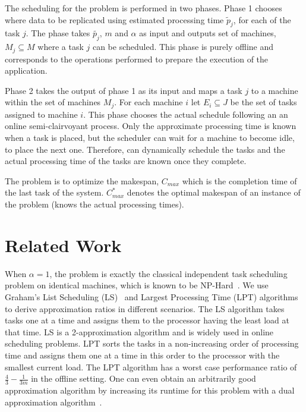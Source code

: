 \documentclass[10pt, conference, compsocconf]{IEEEtran}
\begin{document}
The scheduling for the problem is performed in two phases. Phase 1
chooses where data to be replicated using estimated processing time
$\tilde p_j $, for each of the task $j$. The phase takes
$\tilde{p_j}$, $m$ and $\alpha$ as input and outputs set of machines,
$M_j \subseteq M $ where a task $j$ can be scheduled. This phase is
purely offline and corresponds to the operations performed to prepare
the execution of the application.

Phase 2 takes the output of phase 1 as its input and maps a task $j$
to a machine within the set of machines $M_j$. For each machine $i$
let $E_i \subseteq J$ be the set of tasks assigned to machine
$i$. This phase chooses the actual schedule following an an online
semi-clairvoyant process. Only the approximate processing time is
known when a task is placed, but the scheduler can wait for a machine
to become idle, to place the next one. Therefore, can dynamically
schedule the tasks and the actual processing time of the tasks are
known once they complete.

The problem is to optimize the makespan, $C_{max}$ which is the
completion time of the last task of the system. $C_{max}^{*}$ denotes
the optimal makespan of an instance of the problem (knows the
actual processing times).

\section{Related Work}\label{sec3}

When $\alpha = 1$, the problem is exactly the classical independent
task scheduling problem on identical machines, which is known to be
NP-Hard~\cite{GareyJohnson79}. We use Graham's List Scheduling
(LS)~\cite{Graham66} and Largest Processing Time (LPT)
algorithms~\cite{Graham69boundson} to derive approximation ratios in
different scenarios. The LS algorithm takes tasks one at a time and
assigns them to the processor having the least load at that time. LS is a
2-approximation algorithm and is widely used in online scheduling
problems. LPT sorts the tasks in a non-increasing order of processing time and
assigns them one at a time in this order to the processor with the
smallest current load. The LPT algorithm has a worst case performance
ratio of $\frac{4}{3}-\frac{1}{3m}$ in the offline setting. One can
even obtain an arbitrarily good approximation algorithm by increasing
its runtime for this problem with a dual approximation
algorithm~\cite{Hoch87}.
\end{document}
